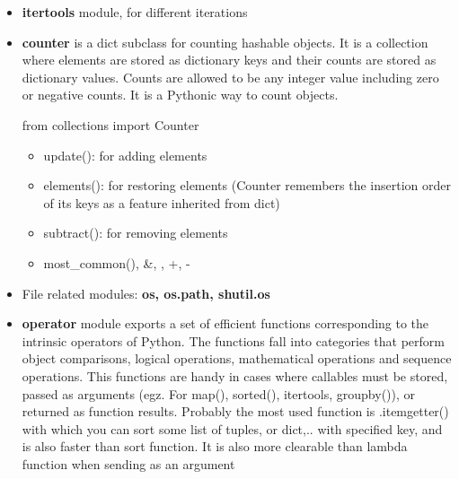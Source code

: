 \documentclass[
  letterpaper,
]{book}
\providecommand{\tightlist}{%
  \setlength{\itemsep}{0pt}\setlength{\parskip}{0pt}}\usepackage{longtable,booktabs,array}
\begin{document}
\begin{itemize}
\item
  \textbf{itertools} module, for different iterations
\item
  \textbf{counter} is a dict subclass for counting hashable objects. It
  is a collection where elements are stored as dictionary keys and their
  counts are stored as dictionary values. Counts are allowed to be any
  integer value including zero or negative counts. It is a Pythonic way
  to count objects.

  from collections import Counter

  \begin{itemize}
  \tightlist
  \item
    update(): for adding elements
  \item
    elements(): for restoring elements (Counter remembers the insertion
    order of its keys as a feature inherited from dict)
  \item
    subtract(): for removing elements
  \item
    most\_common(), \&, \textbar, +, -
  \end{itemize}
\item
  File related modules: \textbf{os, os.path, shutil.os}
\item
  \textbf{operator} module exports a set of efficient functions
  corresponding to the intrinsic operators of Python. The functions fall
  into categories that perform object comparisons, logical operations,
  mathematical operations and sequence operations. This functions are
  handy in cases where callables must be stored, passed as arguments
  (egz. For map(), sorted(), itertools, groupby()), or returned as
  function results. Probably the most used function is .itemgetter()
  with which you can sort some list of tuples, or dict,.. with specified
  key, and is also faster than sort function. It is also more clearable
  than lambda function when sending as an argument


\end{itemize}
\end{document}
